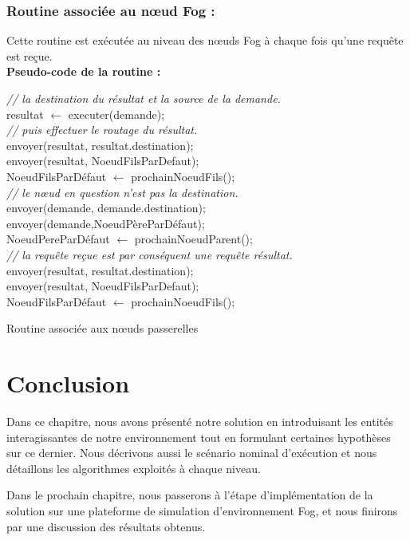 \subsubsection{Routine associée au nœud Fog :}
Cette routine est exécutée au niveau des nœuds Fog à chaque fois qu'une requête est reçue.\\
\textbf{Pseudo-code de la routine :}\\
\begin{algorithm}[H]
  {  
    { 
      \emph{// la destination du résultat et la source de la demande.}\\
      resultat $\gets$ executer(demande);\\
      \emph{// puis effectuer le routage du résultat.}\\
      {
        envoyer(resultat, resultat.destination);\\
      }
      {
        envoyer(resultat, NoeudFilsParDefaut);\\
        NoeudFilsParDéfaut $\gets$ prochainNoeudFils();\\
      }
    }
    {  
      \emph{// le nœud en question n'est pas la destination.}\\
      {
        envoyer(demande, demande.destination);\\
      }
      {
        envoyer(demande,NoeudPèreParDéfaut);\\
        NoeudPereParDéfaut $\gets$ prochainNoeudParent();\\
      }
    }
  }
  {
    \emph{// la requête reçue est par conséquent une requête résultat.}\\
    {
      envoyer(resultat, resultat.destination);\\
    }
    {
      envoyer(resultat, NoeudFilsParDefaut);\\
      NoeudFilsParDéfaut $\gets$ prochainNoeudFils();\\
    }
  }
  \caption{Routine associée aux nœuds passerelles}
\end{algorithm}


\section{Conclusion}
Dans ce chapitre, nous avons présenté notre solution en introduisant les entités interagissantes de notre environnement tout en formulant certaines hypothèses sur ce dernier. Nous décrivons aussi le scénario nominal d'exécution et nous détaillons les algorithmes exploités à chaque niveau.\par
Dans le prochain chapitre, nous passerons à l'étape d'implémentation de la solution sur une plateforme de simulation d'environnement Fog, et nous finirons par une discussion des résultats obtenus.

